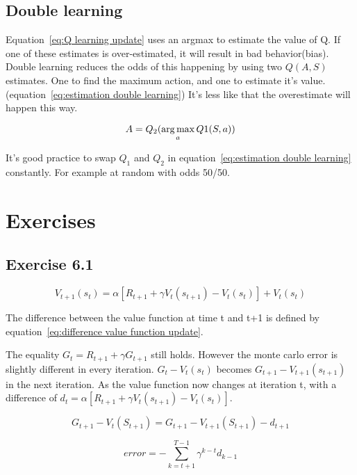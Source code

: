 \subsection{Double learning}
Equation~\ref{eq:Q learning update} uses an argmax to estimate the value of Q. If one of these estimates is over-estimated, it will result in bad behavior(bias). Double learning reduces the odds of this happening by using two $Q(A,S)$ estimates. One to find the maximum action, and one to estimate it's value.(equation~\ref{eq:estimation double learning}) It's less like that the overestimate will happen this way. 

\begin{equation}
A = Q_2(\operatorname*{arg\,max}_a Q1(S,a))
\label{eq:estimation double learning}
\end{equation}
 
 It's good practice to swap $Q_1$ and $Q_2$ in equation~\ref{eq:estimation double learning} constantly. For example at random with odds 50/50.
 
\section{Exercises}

\subsection{Exercise 6.1}

\begin{equation}
V_{t+1}(s_{t}) = \alpha [R_{t+1} + \gamma V_t(s_{t+1})-V_t(s_t)] + V_t(s_t)
\label{eq:difference value function update}
\end{equation}

The difference between the value function at time t and t+1 is defined by equation~\ref{eq:difference value function update}.

The equality $G_t = R_{t+1} + \gamma G_{t+1}$ still holds. However the monte carlo error is slightly different in every iteration. $G_t - V_t(s_t)$ becomes $G_{t+1} - V_{t+1}(s_{t+1})$ in the next iteration. As the value function now changes at iteration t, with a difference of  $d_t = \alpha [R_{t+1} + \gamma V_t(s_{t+1})-V_t(s_t)]$.

\begin{equation}
G_{t+1} - V_t(S_{t+1}) = G_{t+1} - V_{t+1}(S_{t+1})-d_{t+1}
\label{eq:single iteration difference}
\end{equation}

\begin{equation}
error = -\sum_{k=t+1}^{T-1} \gamma^{k-t} d_{k-1}
\label{eq:ex_6_1_difference}
\end{equation}

